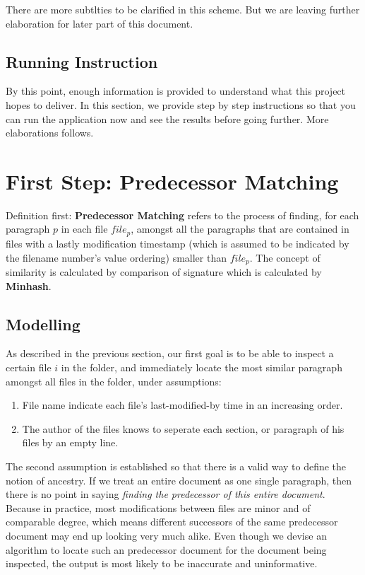 \documentclass{article}
\begin{document}
There are more subtlties to be clarified in this scheme. But we are leaving further elaboration for later part of this document. 

\subsection{Running Instruction}
By this point, enough information is provided to understand what this project hopes to deliver. In this section, we provide step by step instructions so that you can run the application now and see the results before going further. More elaborations follows.

\section{First Step: Predecessor Matching}
Definition first: \textbf{Predecessor Matching} refers to the process of finding, for each paragraph $p$ in each file $file_p$, amongst all the paragraphs that are contained in files with a lastly modification timestamp (which is assumed to be indicated by the filename number's value ordering) smaller than $file_p$. The concept of similarity is calculated by comparison of signature which is calculated by \textbf{Minhash}.
\subsection{Modelling}
As described in the previous section, our first goal is to be able to inspect a certain file $i$ in the folder, and immediately locate the most similar paragraph amongst all files in the folder, under assumptions:
\begin{enumerate}
  \item File name indicate each file's last-modified-by time in an increasing order.
  \item The author of the files knows to seperate each section, or paragraph of his files by an empty line. 
\end{enumerate}

The second assumption is established so that there is a valid way to define the notion of ancestry. If we treat an entire document as one single paragraph, then there is no point in saying \textit{finding the predecessor of this entire document}. Because in practice, most modifications between files are minor and of comparable degree, which means different successors of the same predecessor document may end up looking very much alike. Even though we devise an algorithm to locate such an predecessor document for the document being inspected, the output is most likely to be inaccurate and uninformative. \\
\end{document}
